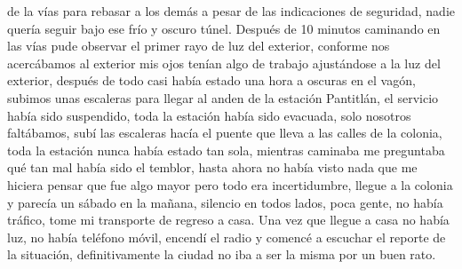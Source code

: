 \documentclass[letterpaper]{article}
\begin{document}
de la vías para rebasar a los demás a pesar de las indicaciones de seguridad, nadie quería seguir
bajo ese frío y oscuro túnel. Después de 10 minutos caminando en las vías pude observar el primer
rayo de luz del exterior, conforme nos acercábamos al exterior mis ojos tenían algo de trabajo
ajustándose a la luz del exterior, después de todo casi había estado una hora a oscuras en el vagón,
subimos unas escaleras para llegar al anden de la estación Pantitlán, el servicio había sido
suspendido, toda la estación había sido evacuada, solo nosotros faltábamos, subí las escaleras hacía
el puente que lleva a las calles de la colonia, toda la estación nunca había estado tan sola,
mientras caminaba me preguntaba qué tan mal había sido el temblor, hasta ahora no había visto nada
que me hiciera pensar que fue algo mayor pero todo era incertidumbre, llegue a la colonia y parecía
un sábado en la mañana, silencio en todos lados, poca gente, no había tráfico, tome mi transporte de
regreso a casa. Una vez que llegue a casa no había luz, no había teléfono móvil, encendí el radio y
comencé a escuchar el reporte de la situación, definitivamente la ciudad no iba a ser la
misma por un buen rato.
\end{document}
